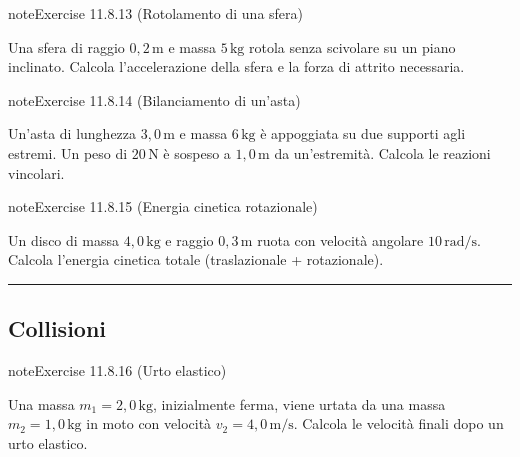 \documentclass[letterpaper,10pt,italian]{jupyterBook}
\begin{document}
\begin{sphinxadmonition}{note}{Exercise 11.8.13 (Rotolamento di una sfera)}



\sphinxAtStartPar
Una sfera di raggio \(0,2 \, \text{m}\) e massa \(5 \, \text{kg}\) rotola senza scivolare su un piano inclinato. Calcola l’accelerazione della sfera e la forza di attrito necessaria.
\end{sphinxadmonition}
 \label{exercise:ch/mechanics/dynamics-problems-exercise-13}

\begin{sphinxadmonition}{note}{Exercise 11.8.14 (Bilanciamento di un’asta)}



\sphinxAtStartPar
Un’asta di lunghezza \(3,0 \, \text{m}\) e massa \(6 \, \text{kg}\) è appoggiata su due supporti agli estremi. Un peso di \(20 \, \text{N}\) è sospeso a \(1,0 \, \text{m}\) da un’estremità. Calcola le reazioni vincolari.
\end{sphinxadmonition}
 \label{exercise:ch/mechanics/dynamics-problems-exercise-14}

\begin{sphinxadmonition}{note}{Exercise 11.8.15 (Energia cinetica rotazionale)}



\sphinxAtStartPar
Un disco di massa \(4,0 \, \text{kg}\) e raggio \(0,3 \, \text{m}\) ruota con velocità angolare \(10 \, \text{rad/s}\). Calcola l’energia cinetica totale (traslazionale + rotazionale).
\end{sphinxadmonition}


\bigskip\hrule\bigskip



\subsection{Collisioni}
\label{\detokenize{ch/mechanics/dynamics-problems:collisioni}} \label{exercise:ch/mechanics/dynamics-problems-exercise-15}

\begin{sphinxadmonition}{note}{Exercise 11.8.16 (Urto elastico)}



\sphinxAtStartPar
Una massa \(m_1 = 2,0 \, \text{kg}\), inizialmente ferma, viene urtata da una massa \(m_2 = 1,0 \, \text{kg}\) in moto con velocità \(v_2 = 4,0 \, \text{m/s}\). Calcola le velocità finali dopo un urto elastico.
\end{sphinxadmonition}
 \label{exercise:ch/mechanics/dynamics-problems-exercise-16}
\end{document}
